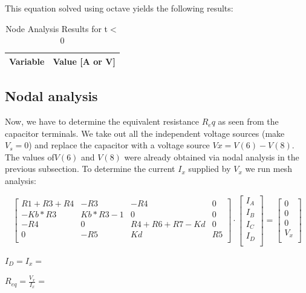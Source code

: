 This equation solved using octave yields the following results:

\begin{table}[H]
    \centering
    \begin{tabular}{|l|r|}
      \hline    
      {\bf Variable} & {\bf Value [A or V]} \\ \hline
    \end{tabular}
    \caption{Node Analysis Results for t$<$0}
    \label{tab:nodeanalysis}
  \end{table}
  
  
\subsection{Nodal analysis}
Now,  we have to determine the equivalent resistance $R_eq$ as seen from the capacitor terminals. We take out all the independent voltage sources (make $V_s=0$) and replace the capacitor with a voltage source $Vx= V(6)-V(8)$. The values of$ V(6)$ and $V(8)$ were already obtained via nodal analysis in the previous subsection. To determine the current $I_x$ supplied by $V_x$ we run mesh analysis:


\begin{equation}\label{eq:matrixeq2}
\begin{bmatrix}
 R1+R3+R4 & -R3 & -R4 & 0\\
    -Kb*R3 &  Kb*R3-1 & 0 & 0\\ 
    -R4 & 0 & R4+R6+R7-Kd & 0\\
    0 & -R5 & Kd & R5 \\
\end{bmatrix}
\cdot
\begin{bmatrix}
I_A\\
I_B \\
I_C \\
I_D \\

    \end{bmatrix}
=
    \begin{bmatrix}
0 \\
0 \\
0 \\
V_x \\

    \end{bmatrix}
  \end{equation}


$I_D = I_x = $
    
$R_{eq} = \frac{V_x}{I_x}= $

